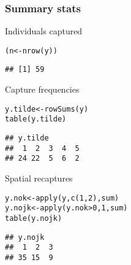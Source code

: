 \documentclass[color=usenames,dvipsnames]{beamer}\usepackage[]{graphicx}\usepackage[]{color}
\makeatletter
\newcommand{\hlnum}[1]{\textcolor[rgb]{0.69,0.494,0}{#1}}%
\newcommand{\hlopt}[1]{\textcolor[rgb]{0,0,0}{#1}}%
\newcommand{\hlstd}[1]{\textcolor[rgb]{0,0,0}{#1}}%
\newcommand{\hlkwb}[1]{\textcolor[rgb]{0,0.341,0.682}{#1}}%
\newcommand{\hlkwd}[1]{\textcolor[rgb]{0.004,0.004,0.506}{#1}}%
\newenvironment{kframe}{%
 \def\at@end@of@kframe{}%
 \ifinner\ifhmode%
  \def\at@end@of@kframe{\end{minipage}}%
  \begin{minipage}{\columnwidth}%
 \fi\fi%
 \def\FrameCommand##1{\hskip\@totalleftmargin \hskip-\fboxsep
 \colorbox{shadecolor}{##1}\hskip-\fboxsep
     \hskip-\linewidth \hskip-\@totalleftmargin \hskip\columnwidth}%
 \MakeFramed {\advance\hsize-\width
   \@totalleftmargin\z@ \linewidth\hsize
   \@setminipage}}%
 {\par\unskip\endMakeFramed%
 \at@end@of@kframe}
\newenvironment{knitrout}{}{} %
\makeatother
\begin{document}
\begin{frame}[fragile]
  \frametitle{Summary stats}
  Individuals captured
\begin{knitrout}\small
{}\color{fgcolor}\begin{kframe}
\begin{alltt}
\hlstd{(n} \hlkwb{<-} \hlkwd{nrow}\hlstd{(y))}
\end{alltt}
\begin{verbatim}
## [1] 59
\end{verbatim}
\end{kframe}
\end{knitrout}
\pause \vfill
  Capture frequencies
  \vspace{-6pt}  
\begin{knitrout}\small
{}\color{fgcolor}\begin{kframe}
\begin{alltt}
\hlstd{y.tilde} \hlkwb{<-} \hlkwd{rowSums}\hlstd{(y)}
\hlkwd{table}\hlstd{(y.tilde)}
\end{alltt}
\begin{verbatim}
## y.tilde
##  1  2  3  4  5 
## 24 22  5  6  2
\end{verbatim}
\end{kframe}
\end{knitrout}
\pause
\vfill
Spatial recaptures
  \vspace{-6pt}  
\begin{knitrout}\small
{}\color{fgcolor}\begin{kframe}
\begin{alltt}
\hlstd{y.nok} \hlkwb{<-} \hlkwd{apply}\hlstd{(y,} \hlkwd{c}\hlstd{(}\hlnum{1}\hlstd{,} \hlnum{2}\hlstd{), sum)}
\hlstd{y.nojk} \hlkwb{<-} \hlkwd{apply}\hlstd{(y.nok}\hlopt{>}\hlnum{0}\hlstd{,} \hlnum{1}\hlstd{, sum)}
\hlkwd{table}\hlstd{(y.nojk)}
\end{alltt}
\begin{verbatim}
## y.nojk
##  1  2  3 
## 35 15  9
\end{verbatim}
\end{kframe}
\end{knitrout}
\end{frame}
\end{document}
